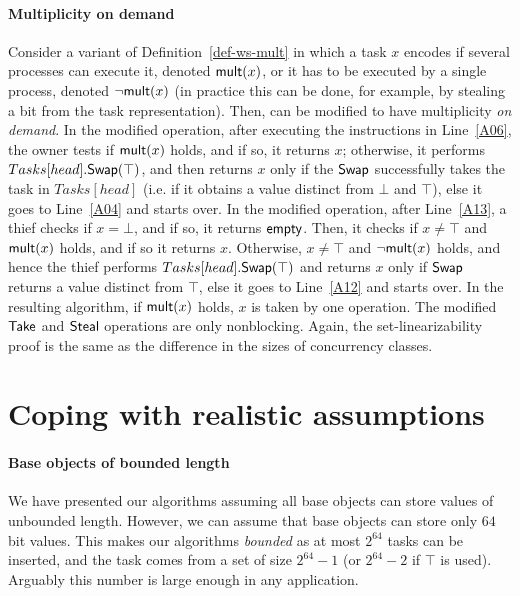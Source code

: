 \paragraph*{Multiplicity on demand}

Consider a variant of Definition~\ref{def-ws-mult} in which a task \(x\) encodes if several processes can execute it, denoted \({\sf mult}(x)\), or it has to be executed by a single process, denoted \({\sf \neg mult}(x)\) (in practice this can be done, for example, by stealing a bit from the task representation). Then, \WFWSM can be modified to have multiplicity \emph{on demand}. In the modified \Take operation, after executing the instructions in Line~\ref{A06}, the owner tests if \({\sf mult}(x)\) holds, and if so, it returns \(x\); otherwise, it performs \(Tasks[head].{\sf \small Swap}(\top)\), and then returns \(x\) only if the \({\sf \small Swap}\) successfully takes the task in \(Tasks[head]\) (i.e. if it obtains a value distinct from $\bot$ and $\top$), else it goes to Line~\ref{A04} and starts over. In the modified \Steal operation, after Line~\ref{A13}, a thief checks if \(x = \bot\), and if so, it returns \({\sf \small empty}\). Then, it checks if \(x \neq \top\) and \({\sf mult}(x)\) holds, and if so it returns \(x\).  Otherwise, \(x \neq \top\) and \({\sf \neg mult}(x)\) holds, and hence the thief performs \(Tasks[head].{\sf \small Swap}(\top)\) and returns \(x\) only if \({\sf \small Swap}\) returns a value distinct from \(\top\), else it goes to Line~\ref{A12} and starts over.  In the resulting algorithm, if \({\sf mult}(x)\) holds, \(x\) is taken by one operation.  The modified ${\sf \small Take}$ and ${\sf \small Steal}$ operations are only nonblocking.  Again, the set-linearizability proof is the same as the difference in the sizes of concurrency classes.

\section{\label{sec-removing-infinite-arrays}Coping with realistic assumptions}

\paragraph*{Base objects of bounded length}
We have presented our algorithms assuming all base objects can store values of unbounded length.  However, we can assume that base objects can store only \(64\) bit values. This makes our algorithms \emph{bounded} as at most \(2^{64}\) tasks can be inserted, and the task comes from a set of size \(2^{64} - 1\) (or \(2^{64} - 2\) if \(\top\) is used).  Arguably this number is large enough in any application.



